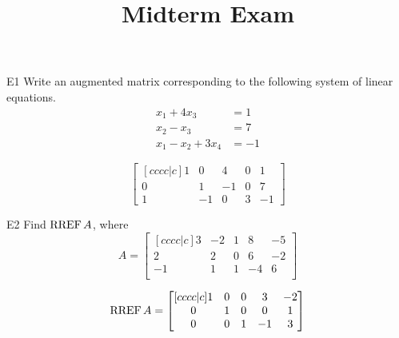 \documentclass{sbgLAexam}
\title{Midterm Exam}
\begin{document}
\begin{problem}{E1}
Write an augmented matrix corresponding to the following system of linear equations.
\begin{align*}
x_1+4x_3 &= 1 \\
x_2-x_3 &= 7 \\
x_1-x_2+3x_4 &= -1
\end{align*}
\end{problem}
\begin{solution}
\[
\begin{bmatrix}[cccc|c]
1 & 0 & 4 & 0 & 1 \\
0 & 1 & -1 & 0 & 7 \\
1 & -1 & 0 & 3 & -1
\end{bmatrix}
\]
\end{solution}

\begin{problem}{E2}
Find \(\operatorname{RREF} A\), where
\[
  A =
  \begin{bmatrix}[cccc|c]
    3 & -2 & 1 & 8 & -5 \\
    2 & 2 & 0 & 6 & -2 \\
    -1 & 1 & 1 & -4 & 6 \\
  \end{bmatrix}
\]
\end{problem}
\begin{solution}
\[
  \operatorname{RREF} A =
  \begin{bmatrix}[cccc|c]
    1 & 0 & 0 & 3 & -2 \\
    0 & 1 & 0 & 0 & 1 \\
    0 & 0 & 1 & -1 & 3
  \end{bmatrix}
\]
\end{solution}
\end{document}
